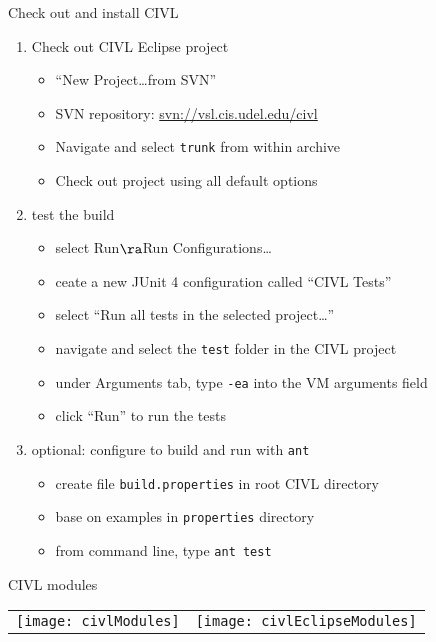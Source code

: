 \documentclass[t]{beamer}
\begin{document}
\begin{frame}{Check out and install CIVL}
  \begin{enumerate}
  \item Check out CIVL Eclipse project 
    \begin{itemize}
    \item ``New Project\ldots from SVN''
    \item SVN repository: \url{svn://vsl.cis.udel.edu/civl}
    \item Navigate and select \texttt{trunk} from within archive
    \item Check out project using all default options
    \end{itemize}
  \item test the build
    \begin{itemize}
    \item select Run$\ra$Run Configurations\ldots
    \item ceate a new JUnit 4 configuration called ``CIVL Tests''
    \item select ``Run all tests in the selected project\ldots''
    \item navigate and select the \texttt{test} folder in the CIVL project
    \item under Arguments tab, type \texttt{-ea} into the VM arguments field
    \item click ``Run'' to run the tests
    \end{itemize}
  \item \alert{optional:} configure to build and run with \texttt{ant}
    \begin{itemize}
    \item create file \texttt{build.properties} in root CIVL directory
    \item base on examples in \texttt{properties} directory
    \item from command line, type \texttt{ant test}
    \end{itemize}
  \end{enumerate}
\end{frame}

\begin{frame}{CIVL modules}
  \begin{tabular}{@{}ll@{}}
    \texttt{[image: civlModules]}
    &
    \texttt{[image: civlEclipseModules]}
  \end{tabular}
\end{frame}
\end{document}
